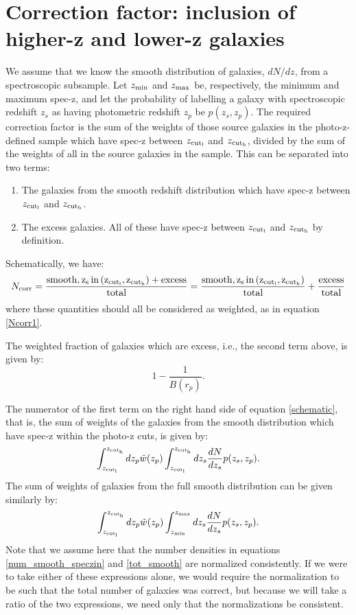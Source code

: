 \documentclass[onecolumn,amsmath,aps,fleqn, superscriptaddress]{revtex4}
\begin{document}
\section*{Correction factor: inclusion of higher-z and lower-z galaxies}
We assume that we know the smooth distribution of galaxies, $dN / dz$, from a spectroscopic subsample. Let $z_{\rm min}$ and $z_{\rm max}$ be, respectively, the minimum and maximum spec-z, and let the probability of labelling a galaxy with spectroscopic redshift $z_s$ as having photometric redshift $z_p$ be $p(z_s, z_p)$. The required correction factor is the sum of the weights of those source galaxies in the photo-z-defined sample which have spec-z between $z_{\rm cut_l}$ and $z_{\rm cut_h}$, divided by the sum of the weights of all in the source galaxies in the sample. This can be separated into two terms:
\begin{enumerate}
\item{The galaxies from the smooth redshift distribution which have spec-z between $z_{\rm cut_l}$ and $z_{\rm cut_h}$.}
\item{The excess galaxies. All of these have spec-z between $z_{\rm cut_l}$ and $z_{\rm cut_h}$ by definition.}
\end{enumerate}
Schematically, we have:
\begin{equation}
N_{\rm corr} = \frac{{\rm smooth, z_s \, in \, (z_{\rm cut_l}, z_{\rm cut_h})} + {\rm excess}}{{\rm total}} =  \frac{{\rm smooth, z_s \, in \, (z_{\rm cut_l}, z_{\rm cut_h})}}{{\rm total}} + \frac{{\rm excess}}{{\rm total}}
\label{schematic}
\end{equation}
where these quantities should all be considered as weighted, as in equation \ref{Ncorr1}.

The weighted fraction of galaxies which are excess, i.e., the second term above, is given by:
\begin{equation}
1 - \frac{1}{B(r_p)}.
\label{frac_excess}
\end{equation}

The numerator of the first term on the right hand side of equation \ref{schematic}, that is, the sum of weights of the galaxies from the smooth distribution which have spec-z within the photo-z cuts, is given by:
\begin{equation}
\int_{z_{\rm cut_l}}^{z_{\rm cut_h}} dz_p \tilde{w}(z_p) \int_{z_{\rm cut_l}}^{z_{\rm cut_h}} dz_s\frac{dN}{dz_s} p(z_s, z_p).
\label{num_smooth_speczin}
\end{equation}
The sum of weights of galaxies from the full smooth distribution can be given similarly by:
\begin{equation}
\int_{z_{\rm cut_l}}^{z_{\rm cut_h}} dz_p  \tilde{w}(z_p) \int_{z_{\rm min}}^{z_{\rm max}} dz_s\frac{dN}{dz_s} p(z_s, z_p).
\label{tot_smooth}
\end{equation}
Note that we assume here that the number densities in equations \ref{num_smooth_speczin} and \ref{tot_smooth} are normalized consistently. If we were to take either of these expressions alone, we would require the normalization to be such that the total number of galaxies was correct, but because we will take a ratio of the two expressions, we need only that the normalizations be consistent.
\end{document}
